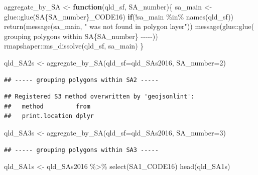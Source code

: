 \documentclass[
]{book}
\newenvironment{Shaded}{\begin{snugshade}}{\end{snugshade}}
\newcommand{\AttributeTok}[1]{\textcolor[rgb]{0.77,0.63,0.00}{#1}}
\newcommand{\ControlFlowTok}[1]{\textcolor[rgb]{0.13,0.29,0.53}{\textbf{#1}}}
\newcommand{\DecValTok}[1]{\textcolor[rgb]{0.00,0.00,0.81}{#1}}
\newcommand{\FunctionTok}[1]{\textcolor[rgb]{0.00,0.00,0.00}{#1}}
\newcommand{\NormalTok}[1]{#1}
\newcommand{\OtherTok}[1]{\textcolor[rgb]{0.56,0.35,0.01}{#1}}
\newcommand{\SpecialCharTok}[1]{\textcolor[rgb]{0.00,0.00,0.00}{#1}}
\newcommand{\StringTok}[1]{\textcolor[rgb]{0.31,0.60,0.02}{#1}}
\begin{document}
\begin{Shaded}
\begin{Highlighting}[]
\NormalTok{aggregate\_by\_SA }\OtherTok{\textless{}{-}} \ControlFlowTok{function}\NormalTok{(qld\_sf, SA\_number)\{}
\NormalTok{  sa\_main }\OtherTok{\textless{}{-}}\NormalTok{ glue}\SpecialCharTok{::}\FunctionTok{glue}\NormalTok{(}\StringTok{\textquotesingle{}SA\{SA\_number\}\_CODE16\textquotesingle{}}\NormalTok{)}
  \ControlFlowTok{if}\NormalTok{(}\SpecialCharTok{!}\NormalTok{sa\_main }\SpecialCharTok{\%in\%} \FunctionTok{names}\NormalTok{(qld\_sf)) }\FunctionTok{return}\NormalTok{(}\FunctionTok{message}\NormalTok{(sa\_main, }\StringTok{" was not found in polygon layer"}\NormalTok{))}
  \FunctionTok{message}\NormalTok{(glue}\SpecialCharTok{::}\FunctionTok{glue}\NormalTok{(}\StringTok{\textquotesingle{}{-}{-}{-}{-}{-} grouping polygons within SA\{SA\_number\} {-}{-}{-}{-}{-}\textquotesingle{}}\NormalTok{))}
\NormalTok{  rmapshaper}\SpecialCharTok{::}\FunctionTok{ms\_dissolve}\NormalTok{(qld\_sf, sa\_main)}
\NormalTok{\}}


\NormalTok{qld\_SA2s }\OtherTok{\textless{}{-}} \FunctionTok{aggregate\_by\_SA}\NormalTok{(}\AttributeTok{qld\_sf=}\NormalTok{qld\_SAs2016, }\AttributeTok{SA\_number=}\DecValTok{2}\NormalTok{)}
\end{Highlighting}
\end{Shaded}

\begin{verbatim}
## ----- grouping polygons within SA2 -----
\end{verbatim}

\begin{verbatim}
## Registered S3 method overwritten by 'geojsonlint':
##   method         from 
##   print.location dplyr
\end{verbatim}

\begin{Shaded}
\begin{Highlighting}[]
\NormalTok{qld\_SA3s }\OtherTok{\textless{}{-}} \FunctionTok{aggregate\_by\_SA}\NormalTok{(}\AttributeTok{qld\_sf=}\NormalTok{qld\_SAs2016, }\AttributeTok{SA\_number=}\DecValTok{3}\NormalTok{)}
\end{Highlighting}
\end{Shaded}

\begin{verbatim}
## ----- grouping polygons within SA3 -----
\end{verbatim}

\begin{Shaded}
\begin{Highlighting}[]
\NormalTok{qld\_SA1s }\OtherTok{\textless{}{-}}\NormalTok{ qld\_SAs2016 }\SpecialCharTok{\%\textgreater{}\%} \FunctionTok{select}\NormalTok{(SA1\_CODE16)}
\FunctionTok{head}\NormalTok{(qld\_SA1s)}
\end{Highlighting}
\end{Shaded}
\end{document}
